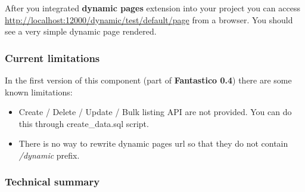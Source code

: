 \documentclass[letterpaper,10pt,english]{sphinxmanual}
\begin{document}
After you integrated \textbf{dynamic pages} extension into your project you can access
\href{http://localhost:12000/dynamic/test/default/page}{http://localhost:12000/dynamic/test/default/page} from a browser. You should see a very simple dynamic page rendered.


\subsubsection{Current limitations}
\label{features/components/dynamic_pages/dynamic_pages:current-limitations}
In the first version of this component (part of \textbf{Fantastico 0.4}) there are some known limitations:
\begin{itemize}
\item {} 
Create / Delete / Update / Bulk listing API are not provided. You can do this through create\_data.sql script.

\item {} 
There is no way to rewrite dynamic pages url so that they do not contain \emph{/dynamic} prefix.

\end{itemize}


\subsubsection{Technical summary}
\label{features/components/dynamic_pages/dynamic_pages:technical-summary}
\end{document}
